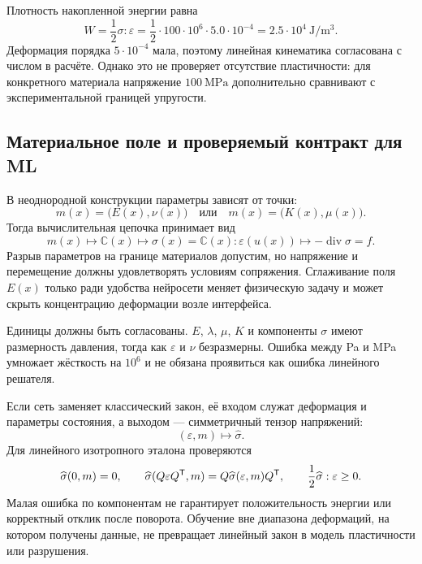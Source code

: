 Плотность накопленной энергии равна
\begin{equation}
\label{eq:worked-energy-v03}
 W
 =\frac12\sigma:\varepsilon
 =\frac12\cdot100\cdot10^6\cdot5.0\cdot10^{-4}
 =2.5\cdot10^4\ \mathrm{J/m^3}.
\end{equation}
Деформация порядка $5\cdot10^{-4}$ мала, поэтому линейная кинематика согласована с числом в расчёте. Однако это не проверяет отсутствие пластичности: для конкретного материала напряжение $100\ \mathrm{MPa}$ дополнительно сравнивают с экспериментальной границей упругости.

\subsection{Материальное поле и проверяемый контракт для ML}

В неоднородной конструкции параметры зависят от точки:
\begin{equation}
\label{eq:material-field-v03}
 m(x)=\bigl(E(x),\nu(x)\bigr)
 \quad\text{или}\quad
 m(x)=\bigl(K(x),\mu(x)\bigr).
\end{equation}
Тогда вычислительная цепочка принимает вид
\begin{equation}
\label{eq:material-pde-chain-v03}
 m(x)
 \longmapsto
 \mathbb{C}(x)
 \longmapsto
 \sigma(x)=\mathbb{C}(x):\varepsilon(u(x))
 \longmapsto
 -\operatorname{div}\sigma=f.
\end{equation}
Разрыв параметров на границе материалов допустим, но напряжение и перемещение должны удовлетворять условиям сопряжения. Сглаживание поля $E(x)$ только ради удобства нейросети меняет физическую задачу и может скрыть концентрацию деформации возле интерфейса.

Единицы должны быть согласованы. $E$, $\lambda$, $\mu$, $K$ и компоненты $\sigma$ имеют размерность давления, тогда как $\varepsilon$ и $\nu$ безразмерны. Ошибка между Pa и MPa умножает жёсткость на $10^6$ и не обязана проявиться как ошибка линейного решателя.

\begin{mlconnection}
Если сеть заменяет классический закон, её входом служат деформация и параметры состояния, а выходом --- симметричный тензор напряжений:
\[
 (\varepsilon,m)\longmapsto\widehat\sigma.
\]
Для линейного изотропного эталона проверяются
\[
 \widehat\sigma(0,m)=0,
 \qquad
 \widehat\sigma(Q\varepsilon Q^{\mathsf{T}},m)
 =Q\widehat\sigma(\varepsilon,m)Q^{\mathsf{T}},
 \qquad
 \frac12\widehat\sigma:\varepsilon\ge0.
\]
Малая ошибка по компонентам не гарантирует положительность энергии или корректный отклик после поворота. Обучение вне диапазона деформаций, на котором получены данные, не превращает линейный закон в модель пластичности или разрушения.
\end{mlconnection}

